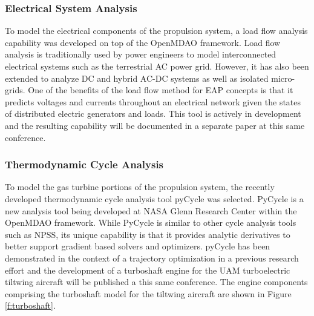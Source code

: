 \subsubsection{Electrical System Analysis} %



To model the electrical components of the propulsion system, a load flow analysis capability was developed on top of the OpenMDAO framework.
Load flow analysis is traditionally used by power engineers to model interconnected electrical systems such as the terrestrial AC power grid.  
However, it has also been extended to analyze DC and hybrid AC-DC systems\cite{ahmed2018generalized} as well as isolated micro-grids.
One of the benefits of the load flow method for EAP concepts is that it predicts voltages and currents throughout an electrical network given the states of distributed electric generators and loads.
This tool is actively in development and the resulting capability will be documented in a separate paper at this same conference.\cite{hendricks2019load}

\subsubsection{Thermodynamic Cycle Analysis} %
To model the gas turbine portions of the propulsion system, the recently developed thermodynamic cycle analysis tool pyCycle was selected.\cite{gray2017chemical,hearn2016optimization}
PyCycle is a new analysis tool being developed at NASA Glenn Research Center within the OpenMDAO framework.
While PyCycle is similar to other cycle analysis tools such as NPSS, its unique capability is that it provides analytic derivatives to better support gradient based solvers and optimizers.  
pyCycle has been demonstrated in the context of a trajectory optimization in a previous research effort\cite{hendricks2017simultaneous} and the development of a turboshaft engine for the UAM turboelectric tiltwing aircraft will be published a this same conference.\cite{chapman2018multi}
The engine components comprising the turboshaft model for the tiltwing aircraft are shown in Figure \ref{f:turboshaft}.

